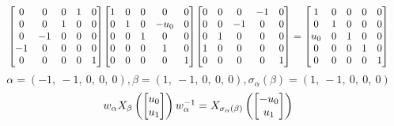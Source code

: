 \documentclass[11pt]{article}
\theoremstyle{definition}
\begin{document}
\[
\scaletoalign{\textwidth}{{\left[\begin{matrix}0 & 0 & 0 & 1 & 0\\0 & 0 & 1 & 0 & 0\\0 & -1 & 0 & 0 & 0\\-1 & 0 & 0 & 0 & 0\\0 & 0 & 0 & 0 & 1\end{matrix}\right]} {\left[\begin{matrix}1 & 0 & 0 & 0 & 0\\0 & 1 & 0 & - u_{0} & 0\\0 & 0 & 1 & 0 & 0\\0 & 0 & 0 & 1 & 0\\0 & 0 & 0 & 0 & 1\end{matrix}\right]} {\left[\begin{matrix}0 & 0 & 0 & -1 & 0\\0 & 0 & -1 & 0 & 0\\0 & 1 & 0 & 0 & 0\\1 & 0 & 0 & 0 & 0\\0 & 0 & 0 & 0 & 1\end{matrix}\right]} = {\left[\begin{matrix}1 & 0 & 0 & 0 & 0\\0 & 1 & 0 & 0 & 0\\u_{0} & 0 & 1 & 0 & 0\\0 & 0 & 0 & 1 & 0\\0 & 0 & 0 & 0 & 1\end{matrix}\right]}}
\]
\[
\alpha = \left( -1, \  -1, \  0, \  0, \  0\right), \beta = \left( 1, \  -1, \  0, \  0, \  0\right), \sigma_{\alpha}(\beta) = \left( 1, \  -1, \  0, \  0, \  0\right)
\]
\[
\scaletoalign{\textwidth}{w_{\alpha} X_{\beta}\left(\left[\begin{matrix}u_{0}\\u_{1}\end{matrix}\right]\right) w_{\alpha}^{-1} = X_{\sigma_{\alpha}\left(\beta\right)}\left(\left[\begin{matrix}- u_{0}\\u_{1}\end{matrix}\right]\right)}
\]
\end{document}
